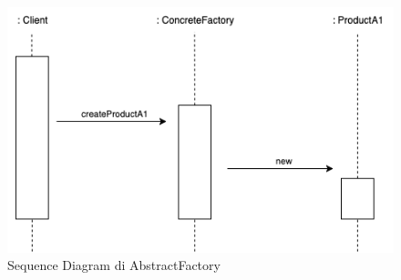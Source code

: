 \begin{figure}[H]
    \centering
    \includegraphics[width=1\linewidth]{assets/pattern/abstract-factory/abstract-factory-sequence.drawio.png}
    \caption{Sequence Diagram di AbstractFactory}
\end{figure}

\newpage